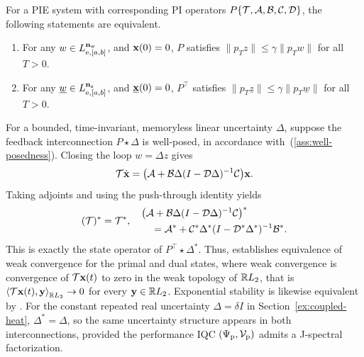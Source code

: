 \begin{theorem}\label{thm:dual-l2-gain}
For a PIE system with corresponding PI operators $P\{\mathcal{T}, \mathcal{A}, \mathcal{B},
\mathcal{C}, \mathcal{D}\}$, the following statements are equivalent.
\begin{enumerate}
\item For any $w\in L_{{\mathrm{e}},[a,b]}^{\mathbf{n}_{{\mathrm{w}}}}$, and
$\mathbf{x}(0)=0$, $P$
satisfies $\|p_T {z}\| \leq \gamma \|p_T {w}\|$ for all $T>0$.
\item For any $\underline{w}\in L_{{\mathrm{e}},[a,b]}^{\mathbf{n}_{{\mathrm{z}}}}$, and
$\underline{\mathbf{x}}(0)=0$, $P^\top$ satisfies $\|p_T \underline{z}\| \leq
\gamma \|p_T \underline{w}\|$ for all $T>0$.
\end{enumerate}
\end{theorem}
For a bounded, time-invariant, memoryless linear uncertainty
$\Delta$, suppose the feedback interconnection $P\star\Delta$ is well-posed,
in accordance with~(\ref{ass:well-posedness}).
Closing the loop $w=\Delta z$ gives
\[
\mathcal{T}\dot{\mathbf{x}}
=\bigl(\mathcal{A}+\mathcal{B}\Delta(I-\mathcal{D}\Delta)^{-1}\mathcal{C}\bigr)\mathbf{x}.
\]
Taking adjoints and using the push-through identity yields
\begin{equation*}
(\mathcal{T})^*=\mathcal{T}^*, \quad\begin{aligned}
&\bigl(\mathcal{A}+\mathcal{B}\Delta(I-\mathcal{D}\Delta)^{-1}\mathcal{C}\bigr)^*\\
&\quad=\mathcal{A}^*+\mathcal{C}^*\Delta^*(I-\mathcal{D}^*\Delta^*)^{-1}\mathcal{B}^*.
\end{aligned}
\end{equation*}
This is exactly the state operator of $P^\top\star\Delta^*$. Thus, \cite[Thm.~6]{shivaknew} establishes
equivalence of weak convergence for the primal and dual states, where weak
convergence is convergence of $\mathcal{T}\mathbf{x}(t)$ to zero in the weak topology
of $\mathbb{R} L_2$, that is $\left\langle \mathcal{T}\mathbf{x}(t), \mathbf{y} \right\rangle_{\mathbb{R} L_2}\to0$ for every
$\mathbf{y}\in\mathbb{R} L_2$.
Exponential stability is likewise equivalent
by \cite[Cor.~8]{shivaknew}. For the constant repeated real uncertainty
$\Delta=\delta I$ in Section~\ref{ex:coupled-heat},
$\Delta^*=\Delta$, so the same uncertainty structure appears in both interconnections, provided
the performance IQC $(\Psi_{\mathrm{p}}, \mathcal{V}_{\mathrm{p}})$ admits a J-spectral factorization.
